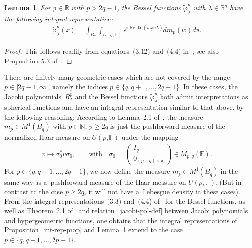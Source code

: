 \documentclass[pdftex]{sigma}
\numberwithin{equation}{section}
\newtheorem{Lemma}[Theorem]{Lemma}
\DeclareMathOperator{\Ree}{Re}
\begin{document}
\begin{Lemma}
\label{Bessel-inte}
For $p\in \mathbb R$ with $p>2q-1$, the Bessel functions $\widetilde\varphi_\lambda^{p}$ with $\lambda \in \mathbb R^q$
have the following integral representation:
\begin{gather}
\label{int-rep-Bessel}
\widetilde\varphi_\lambda^{p}(x)=\int_{B_q}\int_{U(q,\mathbb F)} e^{i\Ree \operatorname{tr}(w \underline x u \underline\lambda)}dm_p(w)du.
\end{gather}
\end{Lemma}

\begin{proof}
This follows readily from equations~(3.12) and~(4.4) in~\cite{R1}; see also Proposition 5.3 of~\cite{RV2}.
\end{proof}

\begin{Remark}
\label{group}
There are f\/initely many geometric cases which are not covered by the range $p\in{}]2q-1,\infty[$, namely the indices
$p\in\{q, q+1, \ldots, 2q-1\}$. In these cases, the Jacobi polyno\-mials~$R_\lambda^p $ and the Bessel functions
$\widetilde\varphi_\lambda^{p}$ both admit interpretations as spherical functions and have an integral representation
similar to that above, by the following reasoning: According to Lemma~2.1 of~\cite{R2}, the measure $m_p\in M^1(B_q)$
with $p\in \mathbb N$, $p\geq 2q$ is just the pushforward measure of the normalized Haar measure on $U(p,\mathbb F)$ under
the mapping
\begin{gather*}
v\mapsto \sigma_0^* v\sigma_0,
\qquad
\text{with}
\quad
\sigma_0=
\begin{pmatrix}
I_q
\\
0_{(p-q)\times q}
\end{pmatrix}
\in M_{p,q}(\mathbb F).
\end{gather*}
For $p\in \{q, q+1, \ldots, 2q-1\}$, we now def\/ine the measure $m_p\in M^1(B_q)$ in the same way as a~pushforward
measure of the Haar measure on $U(p, \mathbb F)$. (But in contrast to the case $p\geq 2q$, it will not have a~Lebesgue
density in these cases).
From the integral representa\-tions~(3.3) and~(4.4) of~\cite{R1} for the Bessel functions, as well as Theorem~2.1
of~\cite{RV2} and relation~\eqref{jacobi-pol-def} between Jacobi polynomials and hypergeometric functions, one obtains
that the integral representations of Proposition~\ref{int-rep-prop} and Lemma~\ref{Bessel-inte} extend
to the case $p\in\{q, q+1, \ldots, 2p-1\}$.
\end{Remark}
\end{document}
